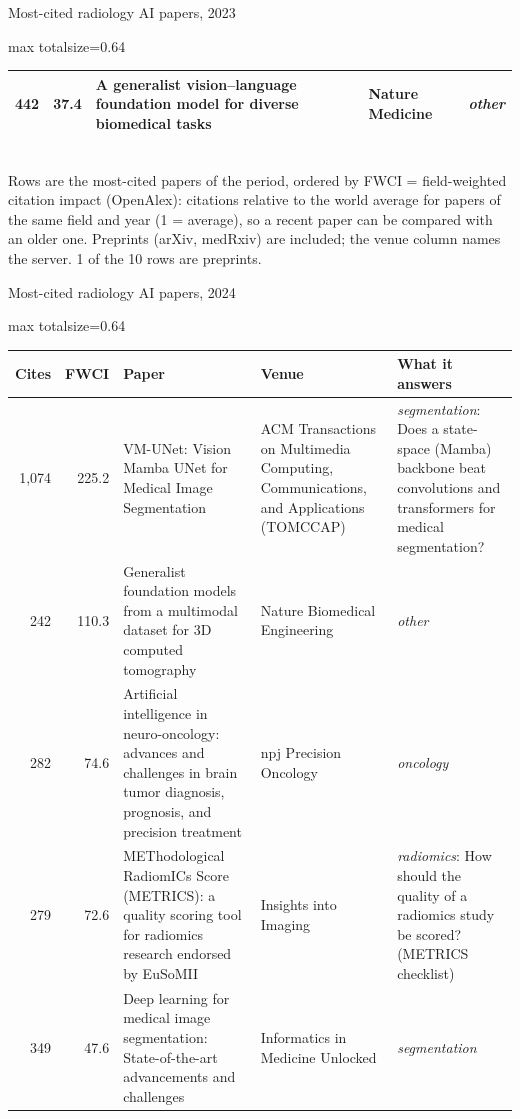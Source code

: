 \documentclass[aspectratio=169]{beamer}
\renewcommand{\arraystretch}{1.08}
\begin{document}
\begin{frame}[category=Journals/Preprints]{Most-cited radiology AI papers, 2023}
\begin{adjustbox}{max totalsize={\textwidth}{0.64\textheight}}
\begin{tabular}{|r|r|>{\raggedright\arraybackslash}p{}|>{\raggedright\arraybackslash}p{}|>{\raggedright\arraybackslash}p{}|}
442 & 37.4 & A generalist vision--language foundation model for diverse biomedical tasks & Nature Medicine & \textit{other} \\ \hline
\end{tabular}
\end{adjustbox}
\\[1pt]
{\tiny Rows are the most-cited papers of the period, ordered by FWCI = field-weighted citation impact (OpenAlex): citations relative to the world average for papers of the same field and year (1 = average), so a recent paper can be compared with an older one. Preprints (arXiv, medRxiv) are included; the venue column names the server. 1 of the 10 rows are preprints.}
\end{frame}

\begin{frame}[category=Journals/Preprints]{Most-cited radiology AI papers, 2024}
\tiny
\begin{adjustbox}{max totalsize={\textwidth}{0.64\textheight}}
\renewcommand{\arraystretch}{1.2}
\begin{tabular}{|r|r|>{\raggedright\arraybackslash}p{}|>{\raggedright\arraybackslash}p{}|>{\raggedright\arraybackslash}p{}|}
\hline \textbf{Cites} & \textbf{FWCI} & \textbf{Paper} & \textbf{Venue} & \textbf{What it answers} \\ \hline
1,074 & 225.2 & VM-UNet: Vision Mamba UNet for Medical Image Segmentation & ACM Transactions on Multimedia Computing, Communications, and Applications (TOMCCAP) & \textit{segmentation}: Does a state-space (Mamba) backbone beat convolutions and transformers for medical segmentation? \\ \hline
242 & 110.3 & Generalist foundation models from a multimodal dataset for 3D computed tomography & Nature Biomedical Engineering & \textit{other} \\ \hline
282 & 74.6 & Artificial intelligence in neuro-oncology: advances and challenges in brain tumor diagnosis, prognosis, and precision treatment & npj Precision Oncology & \textit{oncology} \\ \hline
279 & 72.6 & METhodological RadiomICs Score (METRICS): a quality scoring tool for radiomics research endorsed by EuSoMII & Insights into Imaging & \textit{radiomics}: How should the quality of a radiomics study be scored? (METRICS checklist) \\ \hline
349 & 47.6 & Deep learning for medical image segmentation: State-of-the-art advancements and challenges & Informatics in Medicine Unlocked & \textit{segmentation} \\ \hline

\end{tabular}
\end{adjustbox}
\end{frame}
\end{document}
